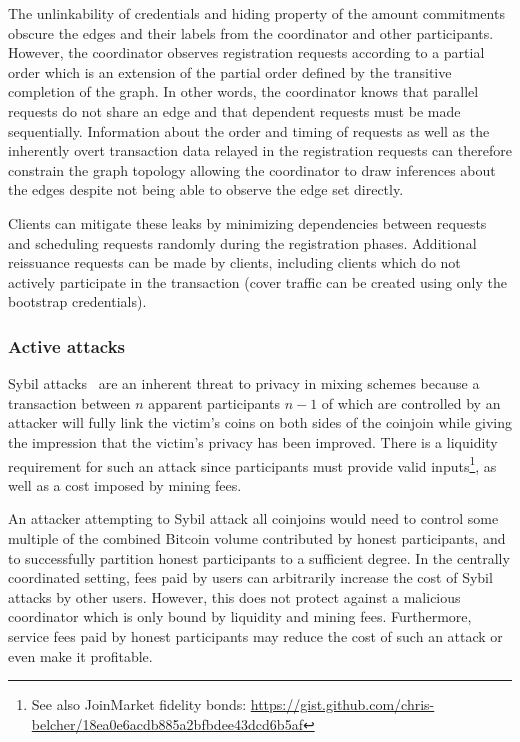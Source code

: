 \documentclass[a4paper]{article}
\begin{document}
The unlinkability of credentials and hiding property of the amount commitments obscure the edges and their labels from the coordinator and other participants. However, the coordinator observes registration requests according to a partial order which is an extension of the partial order defined by the transitive completion of the graph. In other words, the coordinator knows that parallel requests do not share an edge and that dependent requests must be made sequentially. Information about the order and timing of requests as well as the inherently overt transaction data relayed in the registration requests can therefore constrain the graph topology allowing the coordinator to draw inferences about the edges despite not being able to observe the edge set directly.

Clients can mitigate these leaks by minimizing dependencies between requests and scheduling requests randomly during the registration phases. Additional reissuance requests can be made by clients, including clients which do not actively participate in the transaction (cover traffic can be created using only the bootstrap credentials).

\subsubsection{Active attacks}\label{sec:active}

Sybil attacks~\cite{douceur2002sybil} are an inherent threat to privacy in mixing schemes because a transaction between $n$ apparent participants $n-1$ of which are controlled by an attacker will fully link the victim's coins on both sides of the coinjoin while giving the impression that the victim's privacy has been improved. There is a liquidity requirement for such an attack since participants must provide valid inputs\footnote{See also JoinMarket fidelity bonds: \url{https://gist.github.com/chris-belcher/18ea0e6acdb885a2bfbdee43dcd6b5af}}, as well as a cost imposed by mining fees.

An attacker attempting to Sybil attack all coinjoins would need to control some multiple of the combined Bitcoin volume contributed by honest participants, and to successfully partition honest participants to a sufficient degree. In the centrally coordinated setting, fees paid by users can arbitrarily increase the cost of Sybil attacks by other users. However, this does not protect against a malicious coordinator which is only bound by liquidity and mining fees. Furthermore, service fees paid by honest participants may reduce the cost of such an attack or even make it profitable.
\end{document}
